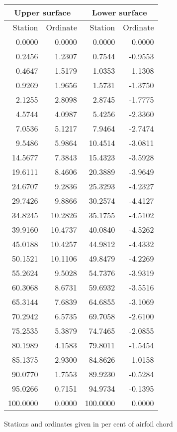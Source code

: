 \documentclass[11pt]{book}
\begin{document}
 \hspace{4mm}
 \begin{tabular}{|r|r|r|r|} \hline 
 \multicolumn{2}{|c|}{Upper surface} & \multicolumn{2}{|c|}{Lower surface} \\
 \hline
 Station & Ordinate & Station & Ordinate \\
 \hline
0.0000 & 0.0000 & 0.0000 & 0.0000 \\
0.2456 & 1.2307 & 0.7544 & -0.9553 \\
0.4647 & 1.5179 & 1.0353 & -1.1308 \\
0.9269 & 1.9656 & 1.5731 & -1.3750 \\
2.1255 & 2.8098 & 2.8745 & -1.7775 \\
4.5744 & 4.0987 & 5.4256 & -2.3360 \\
7.0536 & 5.1217 & 7.9464 & -2.7474 \\
9.5486 & 5.9864 & 10.4514 & -3.0811 \\
14.5677 & 7.3843 & 15.4323 & -3.5928 \\
19.6111 & 8.4606 & 20.3889 & -3.9649 \\
24.6707 & 9.2836 & 25.3293 & -4.2327 \\
29.7426 & 9.8866 & 30.2574 & -4.4127 \\
34.8245 & 10.2826 & 35.1755 & -4.5102 \\
39.9160 & 10.4737 & 40.0840 & -4.5262 \\
45.0188 & 10.4257 & 44.9812 & -4.4332 \\
50.1521 & 10.1106 & 49.8479 & -4.2269 \\
55.2624 & 9.5028 & 54.7376 & -3.9319 \\
60.3068 & 8.6731 & 59.6932 & -3.5516 \\
65.3144 & 7.6839 & 64.6855 & -3.1069 \\
70.2942 & 6.5735 & 69.7058 & -2.6100 \\
75.2535 & 5.3879 & 74.7465 & -2.0855 \\
80.1989 & 4.1583 & 79.8011 & -1.5454 \\
85.1375 & 2.9300 & 84.8626 & -1.0158 \\
90.0770 & 1.7553 & 89.9230 & -0.5284 \\
95.0266 & 0.7151 & 94.9734 & -0.1395 \\
100.0000 & 0.0000 & 100.0000 & 0.0000 \\
 \hline 
 \end{tabular}
 \vspace{8mm}

Stations and ordinates given in per cent of airfoil chord
\end{document}
